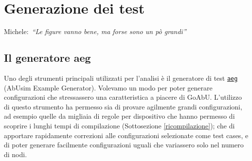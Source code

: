 \documentclass[12pt, a4paper]{article}
\newcommand{\michele}[1]{{\color{red}Michele:~}{\itshape``{#1}''}}
\newcommand{\aeg}[0]{{\lstinline{aeg}}\xspace}
\begin{document}
\newpage

\section{Generazione dei test}

\michele{Le figure vanno bene, ma forse sono un pò grandi}

\subsection{Il generatore aeg}

Uno degli strumenti principali utilizzati per l'analisi è il generatore di test \href{https://github.com/KayJay7/abusim-example-generator}{\aeg} (AbUsim Example Generator). Volevamo un modo per poter generare configurazioni che stressassero una caratteristica a piacere di GoAbU. L'utilizzo di questo strumento ha permesso sia di provare agilmente grandi configurazioni, ad esempio quelle da migliaia di regole per dispositivo che hanno permesso di scoprire i lunghi tempi di compilazione (Sottosezione \ref{ricompilazione}); che di apportare rapidamente correzioni alle configurazioni selezionate come test cases, e di poter generare facilmente configurazioni uguali che variassero solo nel numero di nodi.
\end{document}
